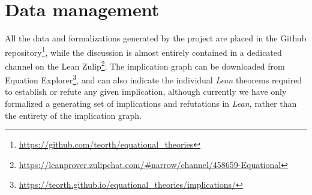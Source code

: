 \section{Data management}

All the data and formalizations generated by the project are placed in the Github repository\footnote{\url{https://github.com/teorth/equational_theories}}, while the discussion is almost entirely contained in a dedicated channel on the Lean Zulip\footnote{\url{https://leanprover.zulipchat.com/\#narrow/channel/458659-Equational}}.  The implication graph can be downloaded from Equation Explorer\footnote{\url{https://teorth.github.io/equational_theories/implications/}}, and can also indicate the individual \emph{Lean} theorems required to establish or refute any given implication, although currently we have only formalized a generating set of implications and refutations in \emph{Lean}, rather than the entirety of the implication graph.
